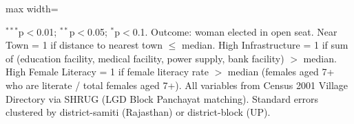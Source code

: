 \begin{adjustbox}{max width=\linewidth}
\begin{threeparttable}[b]
      \begin{tablenotes}
         \item $^{***}$p$<$0.01; $^{**}$p$<$0.05; $^{*}$p$<$0.1. Outcome: woman elected in open seat. Near Town = 1 if distance to nearest town $\leq$ median. High Infrastructure = 1 if sum of (education facility, medical facility, power supply, bank facility) $>$ median. High Female Literacy = 1 if female literacy rate $>$ median (females aged 7+ who are literate / total females aged 7+). All variables from Census 2001 Village Directory via SHRUG (LGD Block Panchayat matching). Standard errors clustered by district-samiti (Rajasthan) or district-block (UP).
      \end{tablenotes}
   \end{threeparttable}
\end{adjustbox}
\par\endgroup


